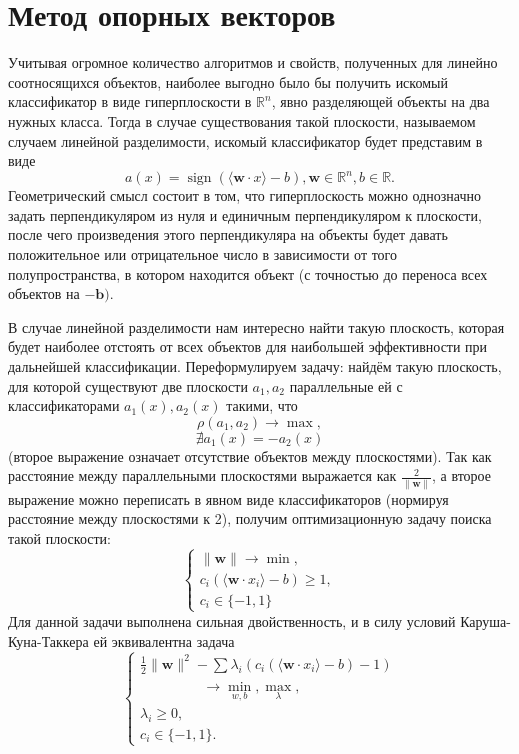 \documentclass[twoside,twocolumn]{article}
\theoremstyle{plain}
\theoremstyle{definition}
\DeclareMathOperator{\sign}{sign}
\begin{document}
\section{Метод опорных векторов}
Учитывая огромное количество алгоритмов и свойств, полученных для линейно соотносящихся объектов, наиболее выгодно было бы получить искомый классификатор в виде гиперплоскости в $\mathbb{R}^n$, явно разделяющей объекты на два нужных класса. Тогда в случае существования такой плоскости, называемом случаем линейной разделимости, искомый классификатор будет представим в виде
\[ a(x) = \sign(\langle \mathbf{w} \cdot x \rangle - b), \mathbf{w} \in \mathbb{R}^n, b \in \mathbb{R}. \]
Геометрический смысл состоит в том, что гиперплоскость можно однозначно задать перпендикуляром из нуля и единичным перпендикуляром к плоскости, после чего произведения этого перпендикуляра на объекты будет давать положительное или отрицательное число в зависимости от того полупространства, в котором находится объект (с точностью до переноса всех объектов на $-\mathbf{b}).$ \par
В случае линейной разделимости нам интересно найти такую плоскость, которая будет наиболее отстоять от всех объектов для наибольшей эффективности при дальнейшей классификации. Переформулируем задачу: найдём такую плоскость, для которой существуют две плоскости $a_1, a_2$ параллельные ей с классификаторами $a_1(x), a_2(x)$ такими, что 
\[\rho(a_1, a_2) \xrightarrow{} \max,\] \[\nexists a_1(x) = -a_2(x)\] 
(второе выражение означает отсутствие объектов между плоскостями).
Так как расстояние между параллельными плоскостями выражается как $\frac{2}{\|\mathbf{w}\|}$, а второе выражение можно переписать в явном виде классификаторов (нормируя расстояние между плоскостями к 2), получим оптимизационную задачу поиска такой плоскости:
\[
\begin{cases}
\|\mathbf{w}\| \xrightarrow{} \min,\\
c_i(\langle \mathbf{w} \cdot x_i \rangle - b) \geq 1, \\
c_i \in \{-1, 1\}
\end{cases}
\]
Для данной задачи выполнена сильная двойственность, и в силу условий Каруша-Куна-Таккера ей эквивалентна задача 
\[
\begin{cases}
\frac{1}{2}\|\mathbf{w}\|^2 - \sum \lambda_i (c_i(\langle \mathbf{w}\cdot x_i \rangle - b) - 1)\\ \;\;\;\;\;\;\;\;\;\;\;\;\;\;\;\; \xrightarrow{} \min_{w, b}, \max_{\lambda},\\
\lambda_i \geq 0, \\
c_i \in \{-1, 1\}.
\end{cases}
\]
\end{document}
